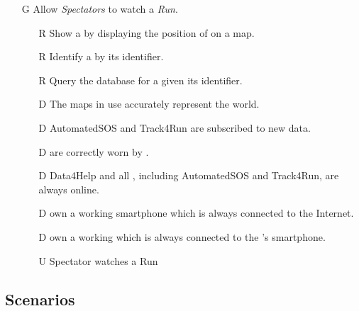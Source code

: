 \documentclass[../../rasd.tex]{subfiles}
\begin{document}
\begin{itemize}
            \item[G\subs{10}]Allow \textit{Spectators} to watch a \textit{Run}.
            \begin{itemize}
                \item[R\subs{46}]Show a  by displaying the position of  on a map.
                \item[R\subs{47}]Identify a  by its identifier.
                \item[R\subs{48}]Query the database for a  given its identifier.
                \\
                \item[D\subs{3}]The maps in use accurately represent the world.
                \item[D\subs{6}]AutomatedSOS and Track4Run are subscribed to new data.
                \item[D\subs{8}] are correctly worn by .
                \item[D\subs{9}]Data4Help and all , including AutomatedSOS and Track4Run, are always online.
                \item[D\subs{10}] own a working smartphone which is always connected to the Internet.
                \item[D\subs{11}] own a working  which is always connected to the 's smartphone.
                \\
                \item[U\subs{15}]Spectator watches a Run
            \end{itemize}
        \end{itemize}











        \subsection{Scenarios}
\end{document}
